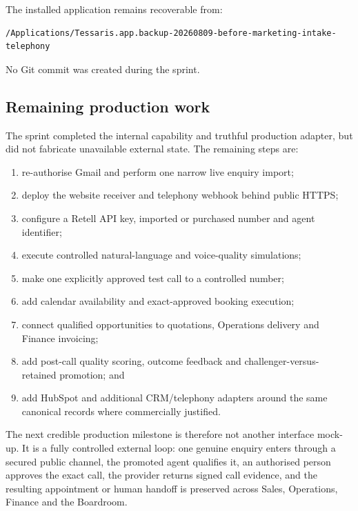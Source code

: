 The installed application remains recoverable from:

\begin{verbatim}
/Applications/Tessaris.app.backup-20260809-before-marketing-intake-telephony
\end{verbatim}

No Git commit was created during the sprint.

\subsection{Remaining production work}

The sprint completed the internal capability and truthful production adapter, but did not fabricate unavailable external state. The remaining steps are:

\begin{enumerate}[leftmargin=*]
    \item re-authorise Gmail and perform one narrow live enquiry import;
    \item deploy the website receiver and telephony webhook behind public HTTPS;
    \item configure a Retell API key, imported or purchased number and agent identifier;
    \item execute controlled natural-language and voice-quality simulations;
    \item make one explicitly approved test call to a controlled number;
    \item add calendar availability and exact-approved booking execution;
    \item connect qualified opportunities to quotations, Operations delivery and Finance invoicing;
    \item add post-call quality scoring, outcome feedback and challenger-versus-retained promotion; and
    \item add HubSpot and additional CRM/telephony adapters around the same canonical records where commercially justified.
\end{enumerate}

The next credible production milestone is therefore not another interface mock-up. It is a fully controlled external loop: one genuine enquiry enters through a secured public channel, the promoted agent qualifies it, an authorised person approves the exact call, the provider returns signed call evidence, and the resulting appointment or human handoff is preserved across Sales, Operations, Finance and the Boardroom.

